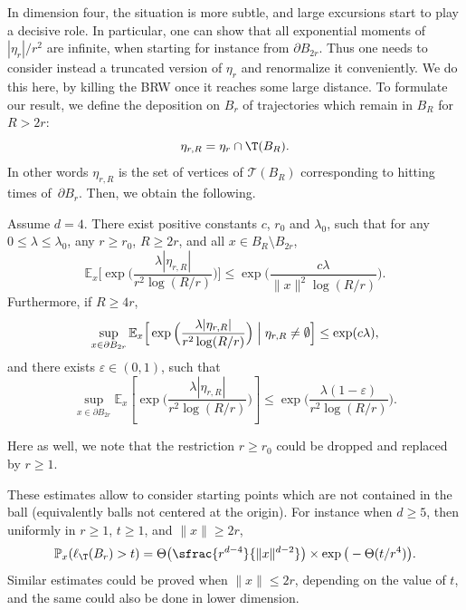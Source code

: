 In dimension four, the situation is more subtle, and large excursions start to play a decisive role.
In particular, one can show that
all exponential moments of $|\eta_r|/r^2$ are infinite, when starting for instance from $\partial B_{2r}$.
Thus one needs to consider instead a truncated version of $\eta_r$ and renormalize it conveniently.
We do this here, by killing the BRW once it reaches some
large distance. To formulate our result, we define the deposition on $B_r$ of
trajectories which remain in $B_R$ for $R>2r$:
\begin{equation*}%
\eta_{r,R} = \eta_r\cap \T(B_R).
\end{equation*}
In other words $\eta_{r,R}$ is the set of vertices
of $\mathcal T(B_R)$ corresponding to hitting times of~$\partial B_r$. Then, we obtain the following.
\begin{theorem}\label{theo.outside4}
Assume $d = 4$. There exist positive constants $c$, $r_0$ and $\lambda_0$, such that for any $0\le \lambda\le \lambda_0$, any $r\ge r_0$, $R\ge 2r$,
and all $x\in B_R\setminus B_{2r}$,
\begin{equation}\label{outside4.1}
\mathbb E_x\Big[\exp \Big(\frac{\lambda|\eta_{r,R}|}{r^2\log (R/r)} \Big)\Big] \le \exp\Big(\frac{c\lambda}{\|x\|^2\log (R/r)}\Big).
\end{equation}
Furthermore, if $R\ge 4r$,
\begin{equation}\label{outside4.2}
\sup_{x\in \partial B_{2r}} \mathbb E_x\Big[
\exp \Big(\frac{\lambda|\eta_{r,R}|}{r^2\log (R/r)} \Big)\Bigm| \eta_{r,R}\neq \emptyset \Big] \le \exp(c\lambda),
\end{equation}
and there exists $\varepsilon \in (0,1)$, such that
\begin{equation}\label{outside4.3}
\sup_{x\in \partial B_{2r}} \mathbb E_x\left[\exp\Big(
\frac{\lambda |\eta_{r,R}|}{r^2\log(R/r)}\Big)\right] \le \exp\Big(\frac{\lambda(1-\varepsilon)}{r^2\log(R/r)}\Big).
\end{equation}
\end{theorem}
Here as well, we note that the restriction $r\ge r_0$ could be dropped and replaced by $r\ge 1$.

These estimates allow to consider starting points which
are not contained in the ball (equivalently balls not centered at the origin).
For instance when $d\ge 5$, then uniformly in $r\ge 1$, $t\ge 1$, and $\|x\|\ge 2r$,
\begin{equation*}
\mathbb P_x(\ell_{\T}(B_r) > t) =
\Theta\big(\sfrac{r^{d-4}}{\|x\|^{d-2}}\big) \times\exp \big(-\Theta(t/r^4)\big).
\end{equation*}
Similar estimates could be proved when $\|x\|\le 2r$,
depending on the value of $t$, and the same could also be done in lower dimension.

